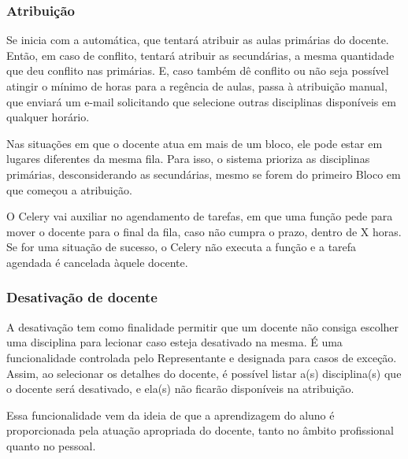 \documentclass[12pt]{article}
\begin{document}
\subsubsection{Atribuição}
\par Se inicia com a automática, que tentará atribuir as aulas primárias do docente. Então, em caso de conflito, tentará atribuir as secundárias, a mesma quantidade que deu conflito nas primárias. E, caso também dê conflito ou não seja possível atingir o mínimo de horas para a regência de aulas, passa à atribuição manual, que enviará um e-mail solicitando que selecione outras disciplinas disponíveis em qualquer horário.
\par Nas situações em que o docente atua em mais de um bloco, ele pode estar em lugares diferentes da mesma fila. Para isso, o sistema prioriza as disciplinas primárias, desconsiderando as secundárias, mesmo se forem do primeiro Bloco em que começou a atribuição.
\par O Celery vai auxiliar no agendamento de tarefas, em que uma função pede para mover o docente para o final da fila, caso não cumpra o prazo, dentro de X horas. Se for uma situação de sucesso, o Celery não executa a função e a tarefa agendada é cancelada àquele docente.
\subsubsection{Desativação de docente}
\par A desativação tem como finalidade permitir que um docente não consiga escolher uma disciplina para lecionar caso esteja desativado na mesma. É uma funcionalidade controlada pelo Representante e designada para casos de exceção. Assim, ao selecionar os detalhes do docente, é possível listar a(s) disciplina(s) que o docente será desativado, e ela(s) não ficarão disponíveis na atribuição.
\par Essa funcionalidade vem da ideia de que a aprendizagem do aluno é proporcionada pela atuação apropriada do docente, tanto no âmbito profissional quanto no pessoal.
\end{document}
